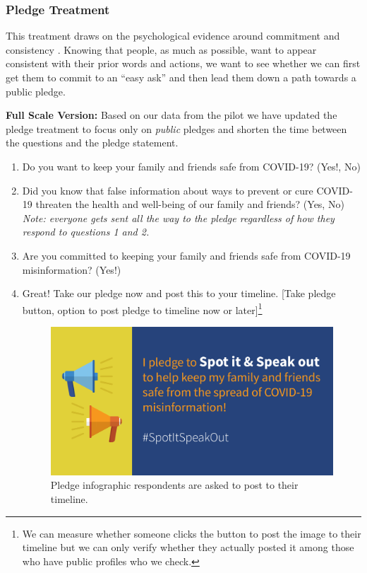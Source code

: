 \documentclass[letterpaper, 12pt, parskip=full,DIV=10]{scrartcl}
\begin{document}
\FloatBarrier


\subsubsection{Pledge Treatment}
\label{sec:pledge}
This treatment draws on the psychological evidence around commitment and consistency \citep{cialdini1987influence,costa2018walking}. Knowing that people, as much as possible, want to appear consistent with their prior words and actions, we want to see whether we can first get them to commit to an ``easy ask'' and then lead them down a path towards a public pledge.

\textbf{{Full Scale Version:}}
Based on our data from the pilot we have updated the pledge treatment to focus only on \textit{public} pledges and shorten the time between the questions and the pledge statement.

\begin{enumerate}

\item Do you want to keep your family and friends safe from COVID-19? (Yes!, No)

\item Did you know that false information about ways to prevent or cure COVID-19 threaten the health and well-being of our family and friends?  (Yes, No)
\\\textit{Note: everyone gets sent all the way to the pledge regardless of how they respond to questions 1 and 2.}

\item Are you committed to keeping your family and friends safe from COVID-19 misinformation? (Yes!)

\item Great! Take our pledge now and post this to your timeline. 
[Take pledge button, option to post pledge to timeline now or later]\footnote{We can measure whether someone clicks the button to post the image to their timeline but we can only verify whether they actually posted it among those who have public profiles who we check.}

\begin{figure}[h]
\centering
\includegraphics[width=.5\textwidth]{figures/pledge_ff.png}
\caption{Pledge infographic respondents are asked to post to their timeline.} %
\end{figure}
\end{enumerate}
\end{document}
